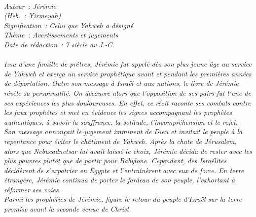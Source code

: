 \BFont
\noindent\hrulefill
{\footnotesize
\textit{
\bigskip
{\centering{}
\\Auteur~: Jérémie
\\(Heb.~: Yirmeyah)
\\Signification~: Celui que Yahweh a désigné
\\Thème~: Avertissements et jugements
\\Date de rédaction~: 7 siècle av J.-C.\\}
}
\textit{
\\Issu d'une famille de prêtres, Jérémie fut appelé dès son plus jeune âge au service de Yahweh et exerça un service prophétique avant et pendant les premières années de déportation. Outre son message à Israël et aux nations, le livre de Jérémie révèle sa personnalité. On découvre alors que l'opposition de ses pairs fut l'une de ses expériences les plus douloureuses. En effet, ce récit raconte ses combats contre les faux prophètes et met en évidence les signes accompagnant les prophètes authentiques, à savoir la souffrance, la solitude, l'incompréhension et le rejet.
\\Son message annonçait le jugement imminent de Dieu et invitait le peuple à la repentance pour éviter le châtiment de Yahweh. Après la chute de Jérusalem, alors que Nebucadnetsar lui avait laissé le choix, Jérémie décida de rester avec les plus pauvres plutôt que de partir pour Babylone. Cependant, des Israélites décidèrent de s'expatrier en Egypte et l'entraînèrent avec eux de force. En terre étrangère, Jérémie continua de porter le fardeau de son peuple, l'exhortant à réformer ses voies. 
\\Parmi les prophéties de Jérémie, figure le retour du peuple d'Israël sur la terre promise avant la seconde venue de Christ.\bigskip
}
}
\par\nobreak\noindent\hrulefill
